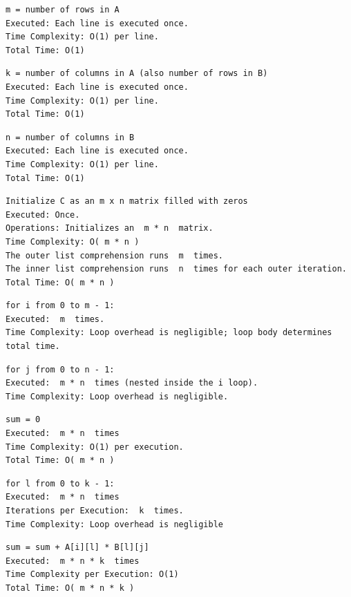 \documentclass[12 pt]{article}
\begin{document}
\begin{verbatim}
m = number of rows in A
Executed: Each line is executed once.
Time Complexity: O(1) per line.
Total Time: O(1)
\end{verbatim}

\begin{verbatim}
k = number of columns in A (also number of rows in B)
Executed: Each line is executed once.
Time Complexity: O(1) per line.
Total Time: O(1)
\end{verbatim}

\begin{verbatim}
n = number of columns in B
Executed: Each line is executed once.
Time Complexity: O(1) per line.
Total Time: O(1)
\end{verbatim}

\begin{verbatim}
Initialize C as an m x n matrix filled with zeros
Executed: Once.
Operations: Initializes an  m * n  matrix.
Time Complexity: O( m * n )
The outer list comprehension runs  m  times.
The inner list comprehension runs  n  times for each outer iteration.
Total Time: O( m * n )
\end{verbatim}

\begin{verbatim}
for i from 0 to m - 1:
Executed:  m  times.
Time Complexity: Loop overhead is negligible; loop body determines total time.
\end{verbatim}

\begin{verbatim}
for j from 0 to n - 1:
Executed:  m * n  times (nested inside the i loop).
Time Complexity: Loop overhead is negligible.
\end{verbatim}

\begin{verbatim}
sum = 0
Executed:  m * n  times
Time Complexity: O(1) per execution.
Total Time: O( m * n )
\end{verbatim}

\begin{verbatim}
for l from 0 to k - 1:
Executed:  m * n  times
Iterations per Execution:  k  times.
Time Complexity: Loop overhead is negligible
\end{verbatim}

\begin{verbatim}
sum = sum + A[i][l] * B[l][j]
Executed:  m * n * k  times
Time Complexity per Execution: O(1)
Total Time: O( m * n * k )
\end{verbatim}
\end{document}
